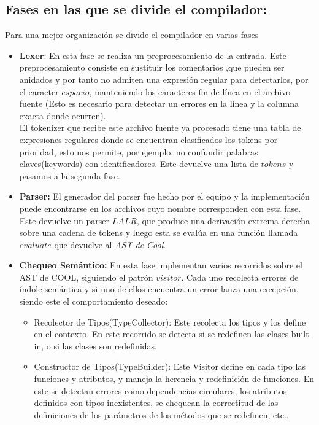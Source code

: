 \documentclass[a4paper, 12pt]{article}
\begin{document}
\subsection*{Fases en las que se divide el compilador:}
Para una mejor organización se divide el compilador en varias fases
\begin{itemize}
\item \textbf{Lexer}: En esta fase se realiza un preprocesamiento de la entrada. 
Este preprocesamiento consiste en sustituir los comentarios ,que pueden ser anidados y 
por tanto no admiten una expresi\'on regular para detectarlos, por el caracter $espacio$, 
manteniendo los caracteres fin de línea en el archivo fuente 
(Esto es necesario para detectar un errores en la línea y la columna exacta donde ocurren).\\
El tokenizer que recibe este archivo fuente ya procesado tiene una tabla de expresiones regulares 
donde se encuentran clasificados los tokens por prioridad, 
esto nos permite, por ejemplo, no confundir palabras claves(keywords) con identificadores. 
Este devuelve una lista de $tokens$ y pasamos a la segunda fase.\\

\item \textbf{Parser:} El generador del parser fue hecho por el equipo y la implementación 
puede encontrarse en los archivos cuyo nombre corresponden con esta fase. 
Este devuelve un parser $LALR$, que produce una derivaci\'on extrema derecha sobre una cadena de tokens y luego 
esta se evalúa en una función llamada $evaluate$ que devuelve al \textit{AST de Cool}.\\

\item \textbf{Chequeo Sem\'antico:} En esta fase implementan varios recorridos sobre el AST de COOL, siguiendo 
el patr\'on $visitor$. 
Cada uno recolecta errores de índole sem\'antica y si uno de ellos encuentra un error lanza una excepción, 
siendo este el comportamiento deseado:
\begin{itemize}
	\item Recolector de Tipos(TypeCollector): Este recolecta los tipos y los define en el contexto. En este recorrido se
	detecta si se redefinen las clases built-in, o si las clases son redefinidas.
	
	\item Constructor de Tipos(TypeBuilder): Este Visitor define en cada tipo las funciones y atributos, 
	y maneja la herencia y redefinición de funciones. 
	En este se detectan errores como dependencias circulares, los atributos definidos con tipos inexistentes, 
	se chequean la correctitud de las definiciones de los par\'ametros de los m\'etodos que se redefinen, etc..


\end{itemize}
\end{itemize}
\end{document}
